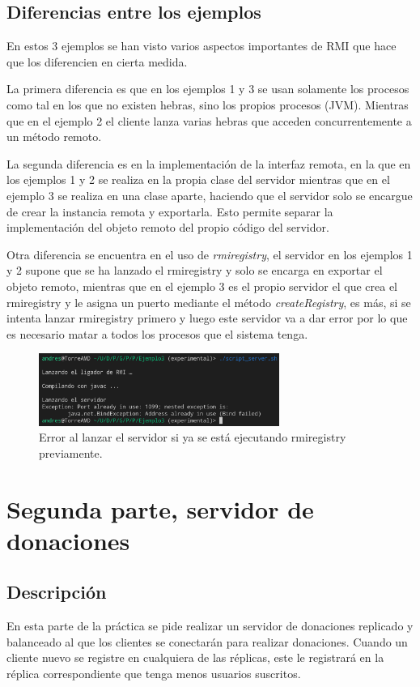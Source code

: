 \documentclass{article}
\begin{document}
\subsection{Diferencias entre los ejemplos}
En estos 3 ejemplos se han visto varios aspectos importantes de RMI que hace que los diferencien en cierta medida. 

La primera diferencia es que en los ejemplos 1 y 3 se usan solamente los procesos como tal en los que no existen hebras, sino los propios procesos (JVM). Mientras que en el ejemplo 2 el cliente lanza varias hebras que acceden concurrentemente a un método remoto.

La segunda diferencia es en la implementación de la interfaz remota, en la que en los ejemplos 1 y 2 se realiza en la propia clase del servidor mientras que en el ejemplo 3 se realiza en una clase aparte, haciendo que el servidor solo se encargue de crear la instancia remota y exportarla. Esto permite separar la implementación del objeto remoto del propio código del servidor.

Otra diferencia se encuentra en el uso de \textit{rmiregistry}, el servidor en los ejemplos 1 y 2 supone que se ha lanzado el rmiregistry y solo se encarga en exportar el objeto remoto, mientras que en el ejemplo 3 es el propio servidor el que crea el rmiregistry y le asigna un puerto mediante el método \textit{createRegistry}, es más, si se intenta lanzar rmiregistry primero y luego este servidor va a dar error por lo que es necesario matar a todos los procesos que el sistema tenga.

\begin{figure}[H]
    \centering
    \includegraphics[width=0.7\textwidth]{imagenes/E3Error.png}
    \caption{Error al lanzar el servidor si ya se está ejecutando rmiregistry previamente.}
\end{figure}


\section{Segunda parte, servidor de donaciones}
\subsection{Descripción}
En esta parte de la práctica se pide realizar un servidor de donaciones replicado y balanceado al que los clientes se conectarán para realizar donaciones. Cuando un cliente nuevo se registre en cualquiera de las réplicas, este le registrará en la réplica correspondiente que tenga menos usuarios suscritos.
\end{document}
